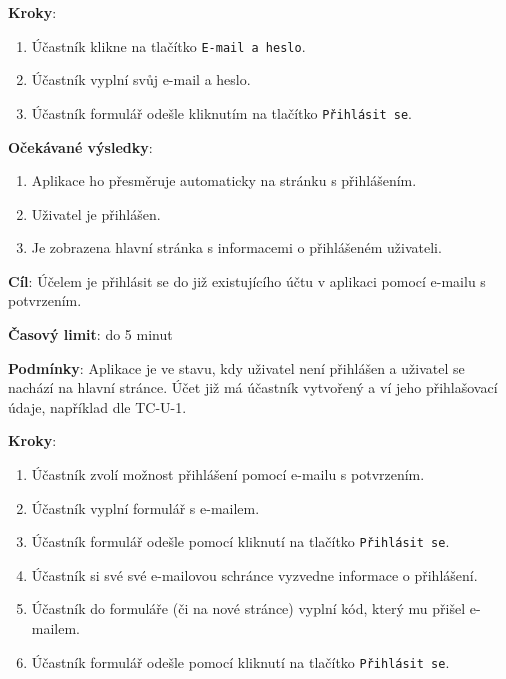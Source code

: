 \textbf{Kroky}:

\begin{enumerate}[leftmargin=1.4cm]
    \item Účastník klikne na tlačítko \verb|E-mail a heslo|.
    \item Účastník vyplní svůj e-mail a heslo.
    \item Účastník formulář odešle kliknutím na tlačítko \verb|Přihlásit se|.
\end{enumerate}

\textbf{Očekávané výsledky}:

\begin{enumerate}[leftmargin=1.4cm]
    \item Aplikace ho přesměruje automaticky na stránku s přihlášením.
    \item Uživatel je přihlášen.
    \item Je zobrazena hlavní stránka s informacemi o přihlášeném uživateli.
\end{enumerate}


\vspace{1em}

\textbf{Cíl}: Účelem je přihlásit se do již existujícího účtu v aplikaci pomocí e-mailu s potvrzením.

\textbf{Časový limit}: do 5 minut

\textbf{Podmínky}: Aplikace je ve stavu, kdy uživatel není přihlášen a uživatel se nachází na hlavní stránce. Účet již má účastník vytvořený a ví jeho přihlašovací údaje, například dle TC-U-1.

\textbf{Kroky}:

\begin{enumerate}[leftmargin=1.4cm]
    \item Účastník zvolí možnost přihlášení pomocí e-mailu s potvrzením.
    \item Účastník vyplní formulář s e-mailem.
    \item Účastník formulář odešle pomocí kliknutí na tlačítko \verb|Přihlásit se|.
    \item Účastník si své své e-mailovou schránce vyzvedne informace o přihlášení.
    \item Účastník do formuláře (či na nové stránce) vyplní kód, který mu přišel e-mailem.
    \item Účastník formulář odešle pomocí kliknutí na tlačítko \verb|Přihlásit se|.
\end{enumerate}

